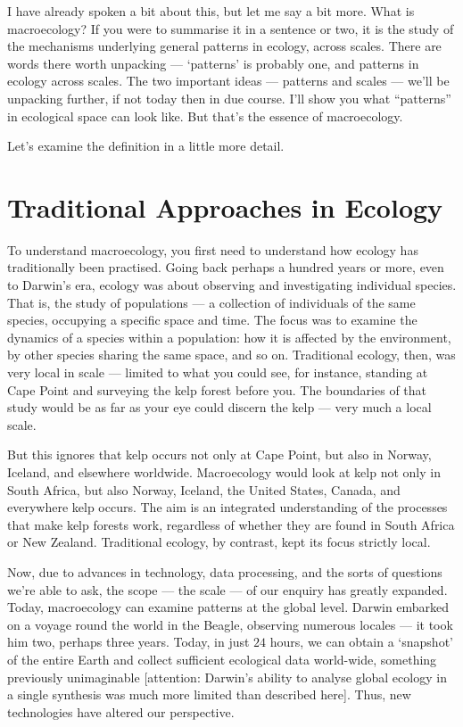 \documentclass[
  10pt,
]{book}
\begin{document}
I have already spoken a bit about this, but let me say a bit more. What
is macroecology? If you were to summarise it in a sentence or two, it is
the study of the mechanisms underlying general patterns in ecology,
across scales. There are words there worth unpacking --- `patterns' is
probably one, and patterns in ecology across scales. The two important
ideas --- patterns and scales --- we'll be unpacking further, if not
today then in due course. I'll show you what ``patterns'' in ecological
space can look like. But that's the essence of macroecology.

Let's examine the definition in a little more detail.

\section{Traditional Approaches in
Ecology}\label{traditional-approaches-in-ecology}

To understand macroecology, you first need to understand how ecology has
traditionally been practised. Going back perhaps a hundred years or
more, even to Darwin's era, ecology was about observing and
investigating individual species. That is, the study of populations ---
a collection of individuals of the same species, occupying a specific
space and time. The focus was to examine the dynamics of a species
within a population: how it is affected by the environment, by other
species sharing the same space, and so on. Traditional ecology, then,
was very local in scale --- limited to what you could see, for instance,
standing at Cape Point and surveying the kelp forest before you. The
boundaries of that study would be as far as your eye could discern the
kelp --- very much a local scale.

But this ignores that kelp occurs not only at Cape Point, but also in
Norway, Iceland, and elsewhere worldwide. Macroecology would look at
kelp not only in South Africa, but also Norway, Iceland, the United
States, Canada, and everywhere kelp occurs. The aim is an integrated
understanding of the processes that make kelp forests work, regardless
of whether they are found in South Africa or New Zealand. Traditional
ecology, by contrast, kept its focus strictly local.

Now, due to advances in technology, data processing, and the sorts of
questions we're able to ask, the scope --- the scale --- of our enquiry
has greatly expanded. Today, macroecology can examine patterns at the
global level. Darwin embarked on a voyage round the world in the Beagle,
observing numerous locales --- it took him two, perhaps three years.
Today, in just \(24\) hours, we can obtain a `snapshot' of the entire
Earth and collect sufficient ecological data world-wide, something
previously unimaginable {[}attention: Darwin's ability to analyse global
ecology in a single synthesis was much more limited than described
here{]}. Thus, new technologies have altered our perspective.
\end{document}
